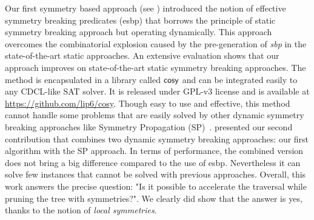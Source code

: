 %
%
Our first symmetry based approach (see ) introduced the notion of effective symmetry breaking predicates (esbp) that borrows the principle of static symmetry breaking approach but operating dynamically\cite{metin2018cdclsym}.
This approach overcomes the combinatorial explosion caused by the pre-generation of \textit{sbp} in the state-of-the-art static approaches.
An extensive evaluation shows that our approach improves on state-of-the-art static 
symmetry breaking approaches.
The method is encapsulated in a library called $\textsf{cosy}$ and can be integrated easily to any
CDCL-like SAT solver. It is released under GPL-v3 license and is available at \url{https://github.com/lip6/cosy}.
Though easy to use and effective, this method cannot handle some problems that are easily solved by other
dynamic symmetry breaking approaches like Symmetry Propagation (SP)~\cite{Devriendt12}.
 presented our second contribution that combines two dynamic symmetry breaking approaches: our first algorithm  with the SP approach. In terms of performance, the combined version does not bring a big difference
compared to the use of esbp. Nevertheless it can solve few instances that cannot be solved with previous approaches.
Overall,  this  work  answers  the  precise  question: "Is it possible to accelerate the traversal while pruning the tree with symmetries?". We clearly did show that the answer is yes, thanks to the notion of \textit{local symmetries}.

%
%
%
%
%
%
%
%
%
